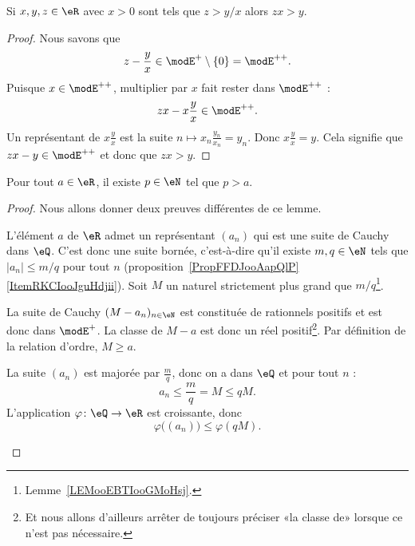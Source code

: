 \begin{lemma}       \label{LemooYNOVooOwoRwD}
	Si \( x,y,z\in \eR\) avec \( x>0\) sont tels que \( z>y/x\) alors \( zx>y\).
\end{lemma}

\begin{proof}
	Nous savons que
	\begin{equation}
		z-\frac{ y }{ x }\in \modE^+\setminus\{ 0 \}=\modE^{++}.
	\end{equation}
	Puisque \( x\in\modE^{++}\), multiplier par \( x\) fait rester dans \( \modE^{++}\) :
	\begin{equation}
		zx-x\frac{ y }{ x }\in \modE^{++}.
	\end{equation}
	Un représentant de \( x\frac{ y }{ x }\) est la suite \( n\mapsto x_n\frac{ y_n }{ x_n }=y_n\). Donc \( x\frac{ y }{ x }=y\). Cela signifie que \( zx-y\in\modE^{++}\) et donc que \( zx>y\).
\end{proof}

\begin{lemma}       \label{LemooMWOUooVWgaEi}
	Pour tout \( a\in \eR\), il existe \( p\in \eN\) tel que \( p>a\).
\end{lemma}

\begin{proof}
	Nous allons donner deux preuves différentes de ce lemme.
	\begin{subproof}

		L'élément \( a\) de \( \eR\) admet un représentant \( (a_n)\) qui est une suite de Cauchy dans \( \eQ\). C'est donc une suite bornée, c'est-à-dire qu'il existe \( m,q\in \eN\) tels que \( | a_n |\leq m/q\) pour tout \( n\) (proposition~\ref{PropFFDJooAapQlP}\ref{ItemRKCIooJguHdjii}). Soit \( M\) un naturel strictement plus grand que \( m/q\)\footnote{Lemme~\ref{LEMooEBTIooGMoHsj}.}.

		La suite de Cauchy \( (M-a_n)_{n\in \eN}\) est constituée de rationnels positifs et est donc dans \( \modE^+\). La classe de \( M-a\) est donc un réel positif\footnote{Et nous allons d'ailleurs arrêter de toujours préciser «la classe de» lorsque ce n'est pas nécessaire.}. Par définition de la relation d'ordre, \( M\geq a\).

		La suite \( (a_n)\) est majorée par \( \frac{ m }{ q }\), donc on a dans \( \eQ\) et pour tout \( n\) :
		\begin{equation}
			a_n\leq \frac{ m }{ q }=M\leq qM.
		\end{equation}
		L'application \( \varphi\colon \eQ\to \eR\) est croissante, donc
		\begin{equation}
			\varphi\big( (a_n) \big)\leq \varphi(qM).
		\end{equation}
	\end{subproof}
\end{proof}


